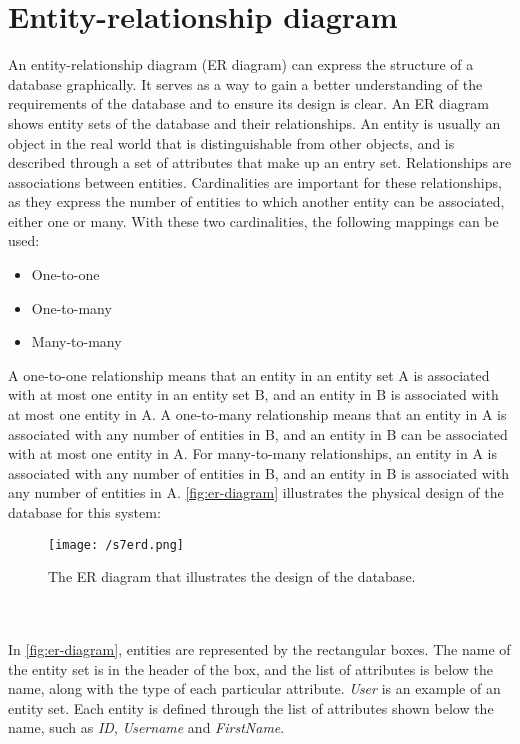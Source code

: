 \section{Entity-relationship diagram}
An entity-relationship diagram (ER diagram) can express the structure of a database graphically\cite{DBConcepts}.
It serves as a way to gain a better understanding of the requirements of the database and to ensure its design is clear.
An ER diagram shows entity sets of the database and their relationships.
An entity is usually an object in the real world that is distinguishable from other objects, and is described through a set of attributes that make up an entry set.
Relationships are associations between entities.
Cardinalities are important for these relationships, as they express the number of entities to which another entity can be associated\cite{DBConcepts}, either one or many.
With these two cardinalities, the following mappings can be used:
\begin{itemize}
    \item One-to-one
    \item One-to-many
    \item Many-to-many
\end{itemize}
A one-to-one relationship means that an entity in an entity set A is associated with at most one entity in an entity set B, and an entity in B is associated with at most one entity in A.
A one-to-many relationship means that an entity in A is associated with any number of entities in B, and an entity in B can be associated with at most one entity in A.
For many-to-many relationships, an entity in A is associated with any number of entities in B, and an entity in B is associated with any number of entities in A\cite{DBConcepts}.
\autoref{fig:er-diagram} illustrates the physical design of the database for this system:
\begin{sidewaysfigure}[tbp]
    \centering
    \texttt{[image: /s7erd.png]}
    \caption{The ER diagram that illustrates the design of the database.}
    \label{fig:er-diagram}
\end{sidewaysfigure}
\\\\
In \autoref{fig:er-diagram}, entities are represented by the rectangular boxes.
The name of the entity set is in the header of the box, and the list of attributes is below the name, along with the type of each particular attribute.
\textit{User} is an example of an entity set.
Each entity is defined through the list of attributes shown below the name, such as \textit{ID}, \textit{Username} and \textit{FirstName}.
